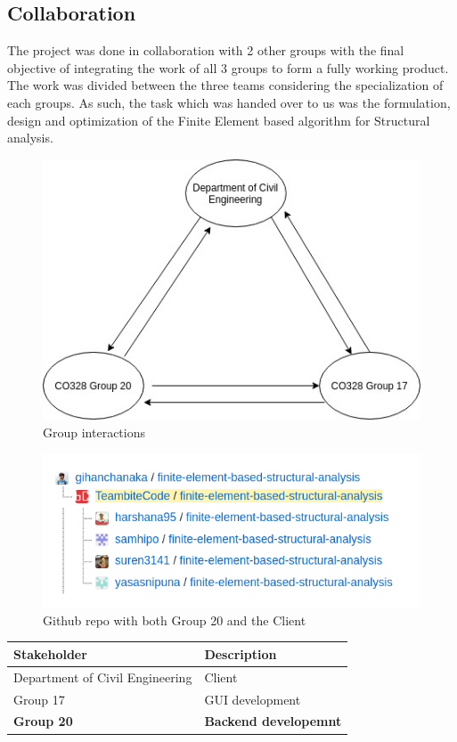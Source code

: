 \documentclass[12pt]{article}
\begin{document}
\subsection{Collaboration}
The project was done in collaboration with 2 other groups with the final objective of integrating the work of all 3 groups to form a fully working product. The work was divided between the three teams considering the specialization of each groups. As such, the task which was handed over to us was the formulation, design and optimization of the Finite Element based algorithm for Structural analysis.

\begin{figure}[H]
    \centering
    \includegraphics[scale=0.5]{images/GroupInteractions.jpeg}
    \caption{Group interactions}
    \label{fig:groups}
\end{figure}

\begin{figure}
    \centering
    \includegraphics[scale=0.5]{images/github.png}
    \caption{Github repo with both Group 20 and the Client}
    \label{fig:my_label}
\end{figure}



\begin{tabular}{|l| l|}
    \hline
    Stakeholder & Description\\
    \hline
     Department of Civil Engineering & Client \\
     Group 17 & GUI development\\
     \textbf{Group 20} & \textbf{Backend developemnt}\\
     \hline
\end{tabular}
\end{document}
